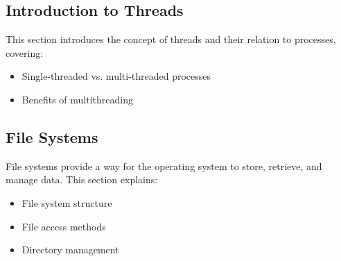 \documentclass[12pt]{article}
\begin{document}
\subsection{Introduction to Threads}
This section introduces the concept of threads and their relation to processes, covering:
\begin{itemize}
    \item Single-threaded vs. multi-threaded processes
    \item Benefits of multithreading
\end{itemize}

\subsection{File Systems}
File systems provide a way for the operating system to store, retrieve, and manage data. This section explains:
\begin{itemize}
    \item File system structure
    \item File access methods
    \item Directory management
\end{itemize}
\end{document}

